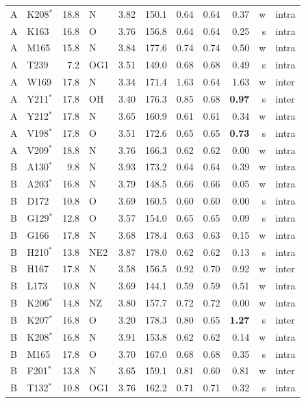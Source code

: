 {\begin{longtable}{llrlrrrrrrl}
A & K208$^{*}$ & 18.8 & N & 3.82 & 150.1 & 0.64 & 0.64 & 0.37 & w & intra \\
A & K163 & 16.8 & O & 3.76 & 156.8 & 0.64 & 0.64 & 0.25 & s & intra \\
A & M165 & 15.8 & N & 3.84 & 177.6 & 0.74 & 0.74 & 0.50 & w & intra \\
A & T239 & 7.2 & OG1 & 3.51 & 149.0 & 0.68 & 0.68 & 0.49 & s & intra \\
A & W169 & 17.8 & N & 3.34 & 171.4 & 1.63 & 0.64 & 1.63 & w & inter \\
A & Y211$^{*}$ & 17.8 & OH & 3.40 & 176.3 & 0.85 & 0.68 & \textbf{0.97} & s & inter \\
A & Y212$^{*}$ & 17.8 & N & 3.65 & 160.9 & 0.61 & 0.61 & 0.34 & w & intra \\
A & V198$^{*}$ & 17.8 & O & 3.51 & 172.6 & 0.65 & 0.65 & \textbf{0.73} & s & intra \\
A & V209$^{*}$ & 18.8 & N & 3.76 & 166.3 & 0.62 & 0.62 & 0.00 & w & intra \\
B & A130$^{*}$ & 9.8 & N & 3.93 & 173.2 & 0.64 & 0.64 & 0.39 & w & intra \\
B & A203$^{*}$ & 16.8 & N & 3.79 & 148.5 & 0.66 & 0.66 & 0.05 & w & intra \\
B & D172 & 10.8 & O & 3.69 & 160.5 & 0.60 & 0.60 & 0.00 & s & intra \\
B & G129$^{*}$ & 12.8 & O & 3.57 & 154.0 & 0.65 & 0.65 & 0.09 & s & intra \\
B & G166 & 17.8 & N & 3.68 & 178.4 & 0.63 & 0.63 & 0.15 & w & intra \\
B & H210$^{*}$ & 13.8 & NE2 & 3.87 & 178.0 & 0.62 & 0.62 & 0.13 & s & intra \\
B & H167 & 17.8 & N & 3.58 & 156.5 & 0.92 & 0.70 & 0.92 & w & inter \\
B & L173 & 10.8 & N & 3.69 & 144.1 & 0.59 & 0.59 & 0.51 & w & intra \\
B & K206$^{*}$ & 14.8 & NZ & 3.80 & 157.7 & 0.72 & 0.72 & 0.00 & w & intra \\
B & K207$^{*}$ & 16.8 & O & 3.20 & 178.3 & 0.80 & 0.65 & \textbf{1.27} & s & inter \\
B & K208$^{*}$ & 16.8 & N & 3.91 & 153.8 & 0.62 & 0.62 & 0.14 & w & intra \\
B & M165 & 17.8 & O & 3.70 & 167.0 & 0.68 & 0.68 & 0.35 & s & intra \\
B & F201$^{*}$ & 13.8 & N & 3.65 & 159.1 & 0.81 & 0.60 & 0.81 & w & inter \\
B & T132$^{*}$ & 10.8 & OG1 & 3.76 & 162.2 & 0.71 & 0.71 & 0.32 & s & intra \\

\end{longtable}}

